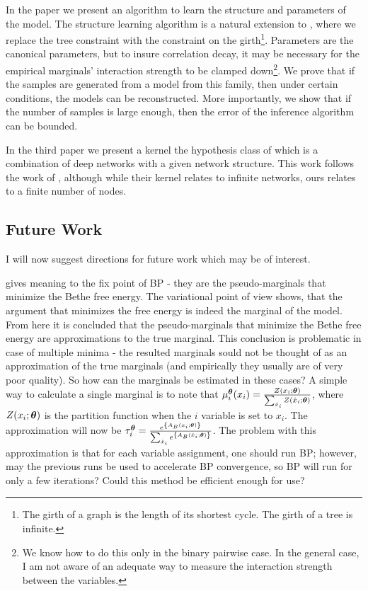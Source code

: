 In the paper we present an algorithm to learn the structure and parameters of the model.
The structure learning algorithm is a natural extension to \cite{chowLiu}, where we replace the tree constraint with the constraint on the girth\footnote{The girth of a graph is the length of its shortest cycle. The girth of a tree is infinite.}.
Parameters are the canonical parameters, but to insure correlation decay, it may be necessary for the empirical marginals' interaction strength to be clamped down\footnote{We know how to do this only in the binary pairwise case. In the general case, I am not aware of an adequate way to measure the interaction strength between the variables.}.
We prove that if the samples are generated from a model from this family, then under certain conditions, the models can be reconstructed.
More importantly, we show that if the number of samples is large enough, then the error of the inference algorithm can be bounded.

In the third paper  we present a kernel the hypothesis class of which is a combination of deep networks with a given network structure. This work follows the work of \cite{cho2009kernel}, although while their kernel relates to infinite networks, ours relates to a finite number of nodes.

\subsection{Future Work}
I will now suggest directions for future work which may be of interest.

 gives meaning to the fix point of BP - they are the pseudo-marginals that minimize the Bethe free energy.  
The variational point of view shows, that the argument that minimizes the free energy is indeed the marginal of the model.
From here it is concluded that the pseudo-marginals that minimize the Bethe free energy are approximations to the true marginal.
This conclusion is problematic in case of multiple minima - the resulted marginals sould not be thought of as an approximation of the true marginals (and empirically they usually are of very poor quality).
So how can the marginals be estimated in these cases?
A simple way to calculate a single marginal is to note that $\mu_i^{\boldsymbol{\theta}}(x_i) = \frac{Z(x_i;\boldsymbol{\theta})}{\sum_{\hat{x}_i}Z(\hat{x}_i;\boldsymbol{\theta})}$, where $Z(x_i;\boldsymbol{\theta})$%
is the partition function when the $i$ variable is set to $x_i$.
The approximation will now be $\tau_i^{\boldsymbol{\theta}} = \frac{e^{\left\{A_B(x_i;\boldsymbol{\theta})\right\}}}{\sum_{\hat{x}_i}e^{\left\{A_B(\hat{x}_i;\boldsymbol{\theta})\right\}}}$.
The problem with this approximation is that for each variable assignment, one should run BP; 
however, may the previous runs be used to accelerate BP convergence, so BP will run for only a few iterations?
Could this method be efficient enough for use?

